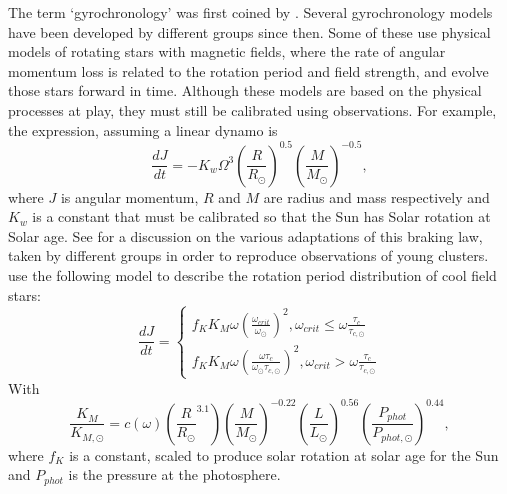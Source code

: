 The term `gyrochronology' was first coined by \citet{Barnes2003}.
Several gyrochronology models have been developed by different groups since
then.
Some of these \citep[\eg][]{Kawaler1988, Collier-cameron1994, Reiners2012,
Epstein2014, VanSaders2014} use physical models of rotating stars with
magnetic fields, where the rate of angular momentum loss is related to the
rotation period and field strength, and evolve those stars forward in time.
Although these models are based on the physical processes at play, they must
still be calibrated using observations.
For example, the \citet{Kawaler1988} expression, assuming a linear dynamo is
\begin{equation}
\frac{dJ}{dt} = -K_w\Omega^3\left(\frac{R}{R_\odot}\right)^{0.5}
\left(\frac{M}{M_\odot}\right)^{-0.5},
\end{equation}
where $J$ is angular momentum, $R$ and $M$ are radius and mass respectively
and $K_w$ is a constant that must be calibrated so that the Sun has Solar
rotation at Solar age.
See \citet{Barnes2010b} for a discussion on the various adaptations of this
braking law, taken by different groups in order to reproduce observations of
young clusters.
\citet{Vansaders2014} use the following model to describe the rotation period
distribution of cool field stars:
\begin{equation}
\frac{dJ}{dt} = \left\{
                \begin{array}{ll}
                  f_K K_M \omega \left( \frac{\omega_{crit}}{\omega_\odot}
                  \right)^2, \omega_{crit} \leq \omega
                  \frac{\tau_{c}}{\tau_{c, \odot}} \\
                  f_K K_M \omega \left( \frac{\omega\tau_{c}}
                  {\omega_\odot\tau_{c, \odot}}
                  \right)^2, \omega_{crit} > \omega
                  \frac{\tau_{c}}{\tau_{c, \odot}}
                \end{array}
              \right.
\end{equation}
\label{eq:vansaders}
With
\begin{equation}
    \frac{K_M}{K_{M, \odot}} = c(\omega)\left(\frac{R}{R_\odot}^{3.1}\right)
    \left(\frac{M}{M_\odot}\right)^{-0.22}
    \left(\frac{L}{L_\odot}\right)^{0.56}
    \left(\frac{P_{phot}}{P_{phot, \odot}}\right)^{0.44},
\end{equation}
\label{eq:vansaders2}
where $f_K$ is a constant, scaled to produce solar rotation at solar age for
the Sun and $P_{phot}$ is the pressure at the photosphere.

